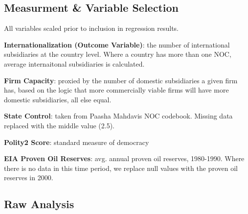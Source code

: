 \documentclass[11pt,]{book}
\begin{document}
\hypertarget{measurment-variable-selection}{%
\subsection{Measurment \& Variable Selection}\label{measurment-variable-selection}}

All variables scaled prior to inclusion in regression results.

\textbf{Internationalization (Outcome Variable)}: the number of international subsidiaries at the country level. Where a country has more than one NOC, average internaitonal subsidiaries is calculated.

\textbf{Firm Capacity}: proxied by the number of domestic subsidiaries a given firm has, based on the logic that more commercially viable firms will have more domestic subsidiaries, all else equal.

\textbf{State Control}: taken from Paasha Mahdavis NOC codebook. Missing data replaced with the middle value (2.5).

\textbf{Polity2 Score}: standard measure of democracy

\textbf{EIA Proven Oil Reserves}: avg. annual proven oil reserves, 1980-1990. Where there is no data in this time period, we replace null values with the proven oil reserves in 2000.

\hypertarget{raw-analysis}{%
\subsection{Raw Analysis}\label{raw-analysis}}
\end{document}
